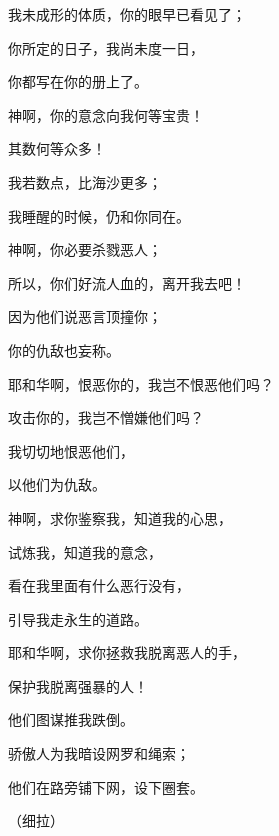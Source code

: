 {\par }{\Q {}我未成形的体质，你的眼早已看见了；
\par }{\Q 你所定的日子，我尚未度一日，
\par }{\Q 你都写在你的册上了。
\par }{\Q {}神啊，你的意念向我何等宝贵！
\par }{\Q 其数何等众多！
\par }{\Q {}我若数点，比海沙更多；
\par }{\Q 我睡醒的时候，仍和你同在。
\par }{\BB \par }{\Q {}神啊，你必要杀戮恶人；
\par }{\Q 所以，你们好流人血的，离开我去吧！
\par }{\Q {}因为他们说恶言顶撞你；
\par }{\Q 你的仇敌也妄称{}。
\par }{\Q {}耶和华啊，恨恶你的，我岂不恨恶他们吗？
\par }{\Q 攻击你的，我岂不憎嫌他们吗？
\par }{\Q {}我切切地恨恶他们，
\par }{\Q 以他们为仇敌。
\par }{\Q {}神啊，求你鉴察我，知道我的心思，
\par }{\Q 试炼我，知道我的意念，
\par }{\Q {}看在我里面有什么恶行没有，
\par }{\Q 引导我走永生的道路。

\par }
{\BB \par }{\Q {}耶和华啊，求你拯救我脱离恶人的手，
\par }{\Q 保护我脱离强暴的人！
\par }{\Q 他们图谋推我跌倒。
\par }{\Q {}骄傲人为我暗设网罗和绳索；
\par }{\Q 他们在路旁铺下网，设下圈套。
\par }{\QS （细拉）
\par }
